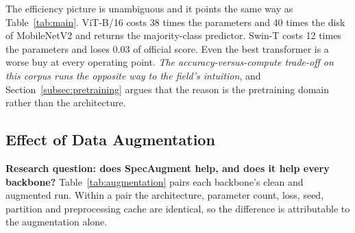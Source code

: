 \documentclass[journal,onecolumn]{IEEEtran}
\begin{document}
The efficiency picture is unambiguous and it points the same way as
Table~\ref{tab:main}. ViT-B/16 costs 38 times the parameters and 40 times the disk
of MobileNetV2 and returns the majority-class predictor. Swin-T costs 12 times the
parameters and loses 0.03 of official score. Even the best transformer is a worse
buy at every operating point. \emph{The accuracy-versus-compute trade-off on this
corpus runs the opposite way to the field's intuition}, and
Section~\ref{subsec:pretraining} argues that the reason is the pretraining domain
rather than the architecture.

\subsection{Effect of Data Augmentation}
\label{subsec:augresults}

\textbf{Research question: does SpecAugment help, and does it help every
backbone?} Table~\ref{tab:augmentation} pairs each backbone's clean and augmented
run. Within a pair the architecture, parameter count, loss, seed, partition and
preprocessing cache are identical, so the difference is attributable to the
augmentation alone.
\end{document}
